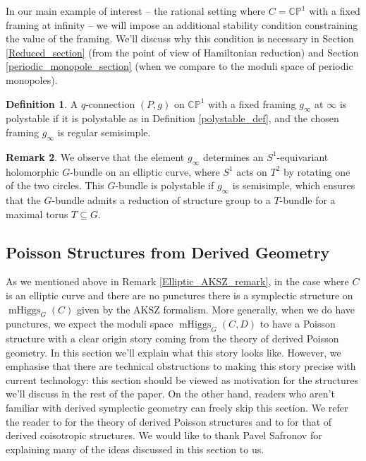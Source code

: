 \documentclass[11pt, oneside, reqno]{amsart}
\theoremstyle{definition} \newtheorem{definition}{Definition}[section]
\theoremstyle{definition} \newtheorem{remark}[definition]{Remark}
\theoremstyle{definition} \newtheorem{remarks}[definition]{Remarks}
\theoremstyle{definition} \newtheorem{question}[definition]{Question}
\theoremstyle{definition} \newtheorem*{note}{Note}
\theoremstyle{definition} \newtheorem{example}[definition]{Example}
\theoremstyle{definition} \newtheorem{examples}[definition]{Examples}
\newcommand{\bb}[1]{\mathbb{#1}}
\newcommand{\sub}{\subseteq}
\DeclareMathOperator{\mhiggs}{mHiggs}
\begin{document}
In our main example of interest -- the rational setting where $C = \bb{CP}^1$ with a fixed framing at infinity -- we will impose an additional stability condition constraining the value of the framing.  We'll discuss why this condition is necessary in Section \ref{Reduced_section} (from the point of view of Hamiltonian reduction) and Section \ref{periodic_monopole_section} (when we compare to the moduli space of periodic monopoles).

\begin{definition} \label{rational_stability_def}
A $q$-connection $(P,g)$ on $\bb{CP}^1$ with a fixed framing $g_\infty$ at $\infty$ is polystable if it is polystable as in Definition \ref{polystable_def}, and the chosen framing $g_\infty$ is regular semisimple.
\end{definition}

\begin{remark}
We observe that the element $g_\infty$ determines an $S^1$-equivariant holomorphic $G$-bundle on an elliptic curve, where $S^1$ acts on $T^2$ by rotating one of the two circles.  This $G$-bundle is polystable if $g_\infty$ is semisimple, which ensures that the $G$-bundle admits a reduction of structure group to a $T$-bundle for a maximal torus $T \sub G$.
\end{remark}

\subsection{Poisson Structures from Derived Geometry}
As we mentioned above in Remark \ref{Elliptic_AKSZ_remark}, in the case where $C$ is an elliptic curve and there are no punctures there is a symplectic structure on $\mhiggs_G(C)$ given by the AKSZ formalism.  More generally, when we do have punctures, we expect the moduli space $\mhiggs_G(C,D)$ to have a Poisson structure with a clear origin story coming from the theory of derived Poisson geometry.  In this section we'll explain what this story looks like.  However, we emphasise that there are technical obstructions to making this story precise with current technology: this section should be viewed as motivation for the structures we'll discuss in the rest of the paper.  On the other hand, readers who aren't familiar with derived symplectic geometry can freely skip this section.  We refer the reader to \cite{CPTVV} for the theory of derived Poisson structures and to \cite{MelaniSafronov1, MelaniSafronov2, Spaide} for that of derived coisotropic structures.  We would like to thank Pavel Safronov for explaining many of the ideas discussed in this section to us.
\end{document}
